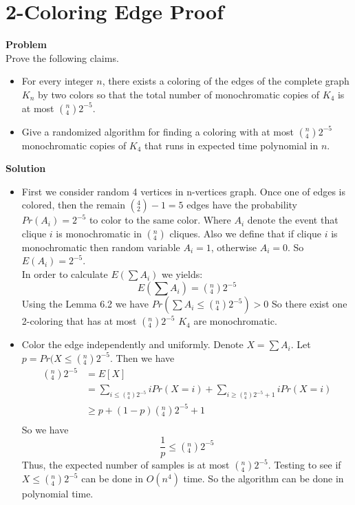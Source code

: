 	\section{2-Coloring Edge Proof}
	\textbf{Problem}\\
	Prove the following claims.
	\begin{itemize}
		\item For every integer $n$, there exists a coloring of the edges of the complete graph $K_n$ by two colors so that the total number of monochromatic copies of $K_4$ is at most $({}_4^n) 2^{-5}$.
		\item Give a randomized algorithm for finding a coloring with at most $({}_4^n) 2^{-5}$ monochromatic copies of $K_4$ that runs in expected time polynomial in $n$.
	\end{itemize}
	\textbf{Solution}\\
	\begin{itemize}
	\item
	First we consider random 4 vertices in n-vertices graph. Once one of edges is colored, then the remain $({}_2^4)-1 = 5$ edges have the probability $Pr(A_i) = 2^{-5}$ to color to the same color. Where $A_i$ denote the event that clique $i$ is monochromatic in $({}_4^n)$ cliques. Also we define that if clique $i$ is monochromatic then random variable $A_i=1$, otherwise $A_i=0$. So $E(A_i) = 2^{-5}$.\\
	In order to calculate $E(\sum A_i)$ we yields:
	\begin{equation*}
	E(\sum A_i) = ({}_4^n)2^{-5}
	\end{equation*}
	Using the Lemma 6.2 we have $Pr(\sum A_i \le ({}_4^n)2^{-5})>0 $
	So there exist one 2-coloring that has at most $({}_4^n)2^{-5}$ $K_4$ are monochromatic.
	
	\item
	Color the edge independently and uniformly. Denote $X = \sum A_i$. Let $p = Pr(X \le ({}_4^n)2^{-5}$. Then we have
	\begin{equation*}
	\begin{split}
	({}_4^n)2^{-5} &= E[X] \\
	&= \sum_{i \le ({}_4^n)2^{-5}} i Pr(X=i) + \sum_{i \ge ({}_4^n)2^{-5}+1} i Pr(X=i) \\
	&\ge p + (1-p) ({}_4^n)2^{-5}+1 \\
	\end{split}
	\end{equation*}
	So we have
	\begin{equation*}
	\frac{1}{p} \le ({}_4^n)2^{-5}
	\end{equation*}
	Thus, the expected number of samples is at most $({}_4^n)2^{-5}$. Testing to see if $X \le ({}_4^n)2^{-5}$ can be done in $O(n^4)$ time. So the algorithm can be done in polynomial time.
	\end{itemize}
	
